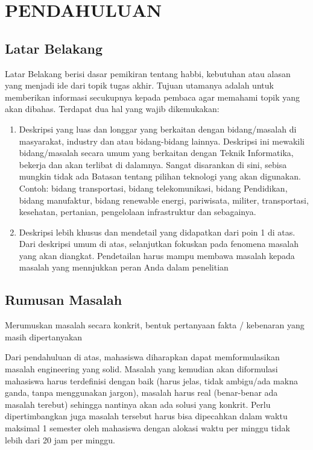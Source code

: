 \newpage
\chapter{PENDAHULUAN} \label{Bab I}

\section{Latar Belakang} \label{I.Latar Belakang}
Latar Belakang berisi dasar pemikiran tentang habbi, kebutuhan atau alasan yang menjadi ide dari topik tugas akhir. Tujuan utamanya adalah untuk memberikan informasi secukupnya kepada pembaca agar memahami topik yang akan dibahas. Terdapat dua hal yang wajib dikemukakan: \par

\begin{enumerate}[noitemsep]
	\item Deskripsi yang luas dan longgar yang berkaitan dengan bidang/masalah di masyarakat, industry dan atau bidang-bidang lainnya. Deskripsi ini mewakili bidang/masalah secara umum yang berkaitan dengan Teknik Informatika, bekerja dan akan terlibat di dalamnya. Sangat disarankan di sini, sebisa mungkin tidak ada Batasan tentang pilihan teknologi yang akan digunakan. Contoh: bidang transportasi, bidang telekomunikasi, bidang Pendidikan, bidang manufaktur, bidang renewable energi, pariwisata, militer, transportasi, kesehatan, pertanian, pengelolaan infrastruktur dan sebagainya.
	\item Deskripsi lebih khusus dan mendetail yang didapatkan dari poin 1 di atas. Dari deskripsi umum di atas, selanjutkan fokuskan pada fenomena masalah yang akan diangkat. Pendetailan harus mampu membawa masalah kepada masalah yang mennjukkan peran Anda dalam penelitian 
\end{enumerate}

\section{Rumusan Masalah} \label{I.Rumusan Masalah}
Merumuskan masalah secara konkrit, bentuk pertanyaan fakta / kebenaran yang masih dipertanyakan \par

Dari pendahuluan di atas, mahasiswa diharapkan dapat memformulasikan masalah engineering yang solid. Masalah yang kemudian akan diformulasi mahasiswa harus terdefinisi dengan baik (harus jelas, tidak ambigu/ada makna ganda, tanpa menggunakan jargon), masalah harus real (benar-benar ada masalah terebut) sehingga nantinya akan ada solusi yang konkrit. Perlu dipertimbangkan juga masalah tersebut harus bisa dipecahkan dalam waktu maksimal 1 semester oleh mahasiswa dengan alokasi waktu per minggu tidak lebih dari 20 jam per minggu. \par


